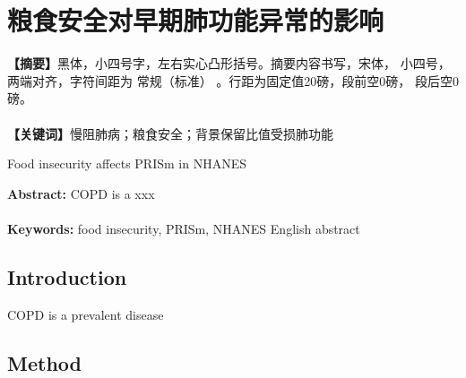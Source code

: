 \bibliographyunit[\chapter]

\renewcommand{\chaptermark}[1]{\markboth{#1}{}} 
\chapter*{\mdseries 粮食安全对早期肺功能异常的影响}


\newcommand{\chineseTitle}[1]{{\centering\Large #1\par}}
\newcommand{\englishTitle}[1]{{\sffamily\centering\Large #1\par}}


\noindent\textbf{【摘要】}黑体，小四号字，左右实心凸形括号。摘要内容书写，宋体， 小四号，两端对齐，字符间距为 常规（标准） 。行距为固定值20磅，段前空0磅， 段后空0磅。
\\ \hspace*{\fill} \\
\noindent\textbf{【关键词】}慢阻肺病；粮食安全；背景保留比值受损肺功能

\vspace{18pt} %

\englishTitle{Food insecurity affects PRISm in NHANES}
\vspace{24pt} %

\noindent\textbf{Abstract:} COPD is a xxx
\\ \hspace*{\fill} \\
\noindent\textbf{Keywords:} food insecurity, PRISm, NHANES
English abstract


\renewcommand{\thesection}{\arabic{section}}
\setcounter{section}{0}
\newpage
\section{Introduction}

COPD is a prevalent disease

\section{Method}

